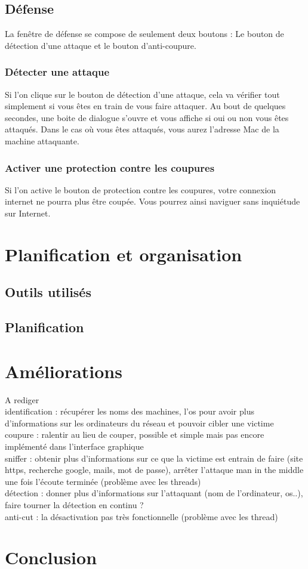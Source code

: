 \documentclass[11pt]{article}
\begin{document}
\subsection{Défense}
La fenêtre de défense se compose de seulement deux boutons : Le bouton de détection d'une attaque et le bouton d'anti-coupure.

\subsubsection{Détecter une attaque}
Si l'on clique sur le bouton de détection d'une attaque, cela va vérifier tout simplement si vous êtes en train de vous faire attaquer. Au bout de quelques secondes, une boite de dialogue s'ouvre et vous affiche si oui ou non vous êtes attaqués. Dans le cas où vous êtes attaqués, vous aurez l'adresse Mac de la machine attaquante.

\subsubsection{Activer une protection contre les coupures}
Si l'on active le bouton de protection contre les coupures, votre connexion internet ne pourra plus être coupée. Vous pourrez ainsi naviguer sans inquiétude sur Internet.

\section{Planification et organisation}
\subsection{Outils utilisés}
\subsection{Planification}

\section{Améliorations}
A rediger\\
identification : récupérer les noms des machines, l'os pour avoir plus d'informations sur les ordinateurs du réseau et pouvoir cibler une victime\\
coupure : ralentir au lieu de couper, possible et simple mais pas encore implémenté dans l'interface graphique\\
sniffer : obtenir plus d'informations sur ce que la victime est entrain de faire (site https, recherche google, mails, mot de passe), arrêter l'attaque man in the middle une fois l'écoute terminée (problème avec les threads)\\
détection : donner plus d'informations sur l'attaquant (nom de l'ordinateur, os..), faire tourner la détection en continu ? \\
anti-cut : la désactivation pas très fonctionnelle (problème avec les thread)\\
\section*{Conclusion}

\newpage
\listoffigures
\lstlistoflistings
\end{document}
